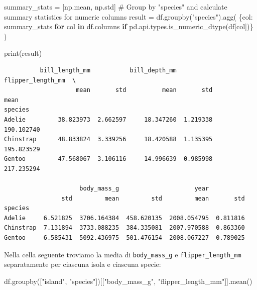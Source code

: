 \documentclass[
  letterpaper,
  krantz2]{{[}./krantz{]}}
\newenvironment{Shaded}{\begin{snugshade}}{\end{snugshade}}
\newcommand{\BuiltInTok}[1]{\textcolor[rgb]{0.00,0.23,0.31}{#1}}
\newcommand{\CommentTok}[1]{\textcolor[rgb]{0.37,0.37,0.37}{#1}}
\newcommand{\ControlFlowTok}[1]{\textcolor[rgb]{0.00,0.23,0.31}{\textbf{#1}}}
\newcommand{\KeywordTok}[1]{\textcolor[rgb]{0.00,0.23,0.31}{\textbf{#1}}}
\newcommand{\NormalTok}[1]{\textcolor[rgb]{0.00,0.23,0.31}{#1}}
\newcommand{\OperatorTok}[1]{\textcolor[rgb]{0.37,0.37,0.37}{#1}}
\newcommand{\StringTok}[1]{\textcolor[rgb]{0.13,0.47,0.30}{#1}}
\begin{document}
\begin{Shaded}
\begin{Highlighting}[]
\NormalTok{summary\_stats }\OperatorTok{=}\NormalTok{ [np.mean, np.std]}
\CommentTok{\# Group by "species" and calculate summary statistics for numeric columns}
\NormalTok{result }\OperatorTok{=}\NormalTok{ df.groupby(}\StringTok{"species"}\NormalTok{).agg(}
\NormalTok{    \{col: summary\_stats }\ControlFlowTok{for}\NormalTok{ col }\KeywordTok{in}\NormalTok{ df.columns }\ControlFlowTok{if}\NormalTok{ pd.api.types.is\_numeric\_dtype(df[col])\}}
\NormalTok{)}

\BuiltInTok{print}\NormalTok{(result)}
\end{Highlighting}
\end{Shaded}

\begin{verbatim}
          bill_length_mm           bill_depth_mm           flipper_length_mm  \
                    mean       std          mean       std              mean   
species                                                                        
Adelie         38.823973  2.662597     18.347260  1.219338        190.102740   
Chinstrap      48.833824  3.339256     18.420588  1.135395        195.823529   
Gentoo         47.568067  3.106116     14.996639  0.985998        217.235294   

                     body_mass_g                     year            
                std         mean         std         mean       std  
species                                                              
Adelie     6.521825  3706.164384  458.620135  2008.054795  0.811816  
Chinstrap  7.131894  3733.088235  384.335081  2007.970588  0.863360  
Gentoo     6.585431  5092.436975  501.476154  2008.067227  0.789025  
\end{verbatim}

Nella cella seguente troviamo la media di \texttt{body\_mass\_g} e
\texttt{flipper\_length\_mm} separatamente per ciascuna isola e ciascuna
specie:

\begin{Shaded}
\begin{Highlighting}[]
\NormalTok{df.groupby([}\StringTok{"island"}\NormalTok{, }\StringTok{"species"}\NormalTok{])[[}\StringTok{"body\_mass\_g"}\NormalTok{, }\StringTok{"flipper\_length\_mm"}\NormalTok{]].mean()}
\end{Highlighting}
\end{Shaded}
\end{document}
